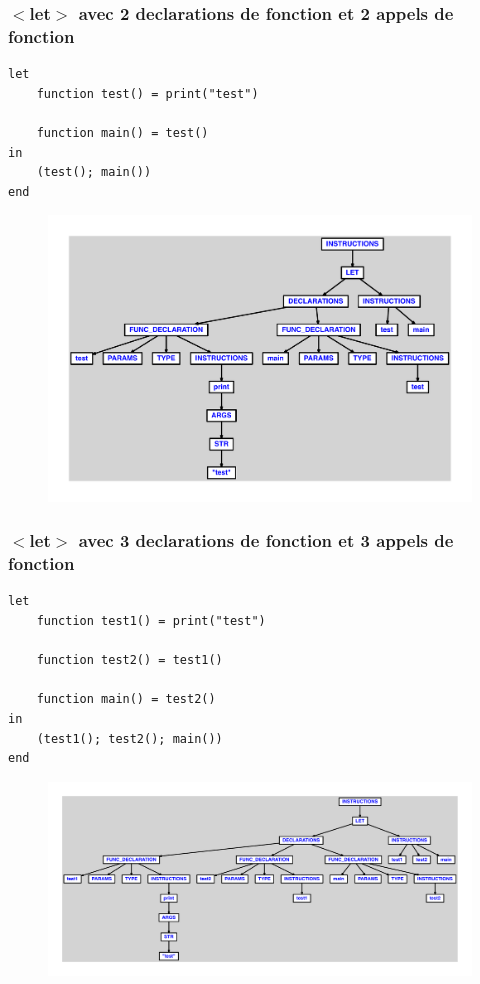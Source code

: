 \documentclass{article}
\begin{document}
\subsubsection{$ < $let$ > $ avec 2 declarations de fonction et 2 appels de fonction}
\begin{lstlisting}
let
	function test() = print("test")

	function main() = test()
in
	(test(); main())
end
\end{lstlisting}
\newpage
\begin{figure}[H]
\centering
\includegraphics[max width=\textwidth]{ast/ast_273.pdf}
\end{figure}
\newpage
\subsubsection{$ < $let$ > $ avec 3 declarations de fonction et 3 appels de fonction}
\begin{lstlisting}
let
	function test1() = print("test")

	function test2() = test1()

	function main() = test2()
in
	(test1(); test2(); main())
end
\end{lstlisting}
\newpage
\begin{figure}[H]
\centering
\includegraphics[max width=\textwidth]{ast/ast_274.pdf}
\end{figure}
\newpage
\end{document}
